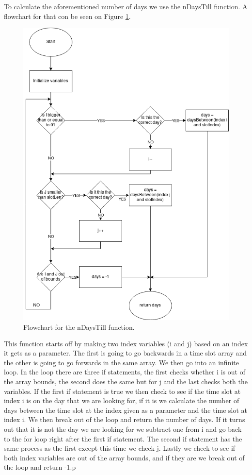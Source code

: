 To calculate the aforementioned number of days we use the nDaysTill function. A flowchart for that con be seen on Figure \ref{fig:flow_nDaysTill}.

\clearpage
\begin{figure}[ht!]
    \centering
    \includegraphics[width=\textwidth]{media/Flowcharts/nDaysTill_flow.png}
    \caption{Flowchart for the nDaysTill function.}
    \label{fig:flow_nDaysTill}
\end{figure}

This function starts off by making two index variables (i and j) based on an index it gets as a parameter. The first is going to go backwards in a time slot array and the other is going to go forwards in the same array. We then go into an infinite loop. In the loop there are three if statements, the first checks whether i is out of the array bounds, the second does the same but for j and the last checks both the variables. If the first if statement is true we then check to see if the time slot at index i is on the day that we are looking for, if it is we calculate the number of days between the time slot at the index given as a parameter and the time slot at index i. We then break out of the loop and return the number of days. If it turns out that it is not the day we are looking for we subtract one from i and go back to the for loop right after the first if statement. The second if statement has the same process as the first except this time we check j. Lastly we check to see if both index variables are out of the array bounds, and if they are we break out of the loop and return -1.p